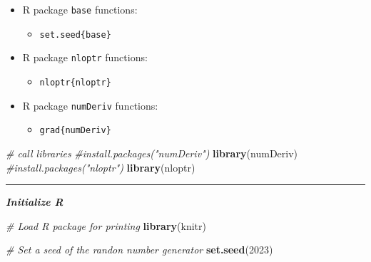 \documentclass[
]{article}
\newenvironment{Shaded}{\begin{snugshade}}{\end{snugshade}}
\newcommand{\CommentTok}[1]{\textcolor[rgb]{0.56,0.35,0.01}{\textit{#1}}}
\newcommand{\DecValTok}[1]{\textcolor[rgb]{0.00,0.00,0.81}{#1}}
\newcommand{\KeywordTok}[1]{\textcolor[rgb]{0.13,0.29,0.53}{\textbf{#1}}}
\newcommand{\NormalTok}[1]{#1}
\providecommand{\tightlist}{%
  \setlength{\itemsep}{0pt}\setlength{\parskip}{0pt}}
\begin{document}
\begin{itemize}
\tightlist
\item
  R package \texttt{base} functions:

  \begin{itemize}
  \tightlist
  \item
    \texttt{set.seed\{base\}}
  \end{itemize}
\item
  R package \texttt{nloptr} functions:

  \begin{itemize}
  \tightlist
  \item
    \texttt{nloptr\{nloptr\}}
  \end{itemize}
\item
  R package \texttt{numDeriv} functions:

  \begin{itemize}
  \tightlist
  \item
    \texttt{grad\{numDeriv\}}
  \end{itemize}
\end{itemize}

\begin{Shaded}
\begin{Highlighting}[]
\CommentTok{\# call libraries}
\CommentTok{\#install.packages("numDeriv")}
\KeywordTok{library}\NormalTok{(numDeriv)}
\CommentTok{\#install.packages("nloptr")}
\KeywordTok{library}\NormalTok{(nloptr)}
\end{Highlighting}
\end{Shaded}

\begin{center}\rule{0.5\linewidth}{0.5pt}\end{center}

\textbf{\emph{Initialize R}}

\begin{Shaded}
\begin{Highlighting}[]
\CommentTok{\# Load R package for printing}
\KeywordTok{library}\NormalTok{(knitr)}
\end{Highlighting}
\end{Shaded}

\begin{Shaded}
\begin{Highlighting}[]
\CommentTok{\# Set a seed of the randon number generator}
\KeywordTok{set.seed}\NormalTok{(}\DecValTok{2023}\NormalTok{)}
\end{Highlighting}
\end{Shaded}
\end{document}

